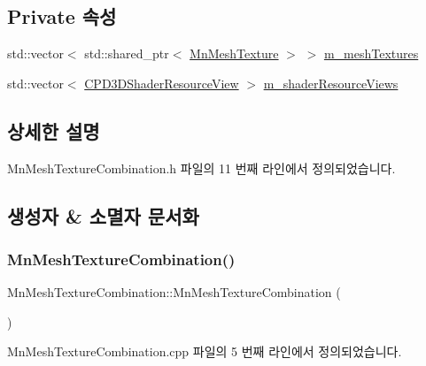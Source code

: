 \subsection*{Private 속성}
\begin{DoxyCompactItemize}
\item 
std\+::vector$<$ std\+::shared\+\_\+ptr$<$ \hyperlink{class_m_n_l_1_1_mn_mesh_texture}{Mn\+Mesh\+Texture} $>$ $>$ \hyperlink{class_m_n_l_1_1_mn_mesh_texture_combination_a63aac894ab731ea3ab1024246b561fd7}{m\+\_\+mesh\+Textures}
\item 
std\+::vector$<$ \hyperlink{namespace_m_n_l_a93794d93663474ff79c950ed985565aa}{C\+P\+D3\+D\+Shader\+Resource\+View} $>$ \hyperlink{class_m_n_l_1_1_mn_mesh_texture_combination_a665314c3b4ca74800ecf2d36245cfa0b}{m\+\_\+shader\+Resource\+Views}
\end{DoxyCompactItemize}


\subsection{상세한 설명}


Mn\+Mesh\+Texture\+Combination.\+h 파일의 11 번째 라인에서 정의되었습니다.



\subsection{생성자 \& 소멸자 문서화}
\mbox{\label{class_m_n_l_1_1_mn_mesh_texture_combination_ad83519e7ad5c93f11ed7e3a412dafdd8}} 
\subsubsection{\texorpdfstring{Mn\+Mesh\+Texture\+Combination()}{MnMeshTextureCombination()}}
{\footnotesize\ttfamily Mn\+Mesh\+Texture\+Combination\+::\+Mn\+Mesh\+Texture\+Combination (\begin{DoxyParamCaption}{ }\end{DoxyParamCaption})}



Mn\+Mesh\+Texture\+Combination.\+cpp 파일의 5 번째 라인에서 정의되었습니다.

